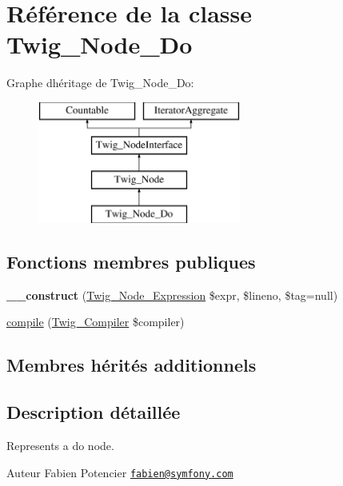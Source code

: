 \hypertarget{class_twig___node___do}{}\section{Référence de la classe Twig\+\_\+\+Node\+\_\+\+Do}
\label{class_twig___node___do}
Graphe d\textquotesingle{}héritage de Twig\+\_\+\+Node\+\_\+\+Do\+:\begin{figure}[H]
\begin{center}
\leavevmode
\includegraphics[height=4.000000cm]{class_twig___node___do}
\end{center}
\end{figure}
\subsection*{Fonctions membres publiques}
\begin{DoxyCompactItemize}
\item 
{\bfseries \+\_\+\+\_\+construct} (\hyperlink{class_twig___node___expression}{Twig\+\_\+\+Node\+\_\+\+Expression} \$expr, \$lineno, \$tag=null)\hypertarget{class_twig___node___do_a3846bdad0632470525ae7d3080f6b188}{}\label{class_twig___node___do_a3846bdad0632470525ae7d3080f6b188}

\item 
\hyperlink{class_twig___node___do_a4e0faa87c3fae583620b84d3607085da}{compile} (\hyperlink{class_twig___compiler}{Twig\+\_\+\+Compiler} \$compiler)
\end{DoxyCompactItemize}
\subsection*{Membres hérités additionnels}


\subsection{Description détaillée}
Represents a do node.

\begin{DoxyAuthor}{Auteur}
Fabien Potencier \href{mailto:fabien@symfony.com}{\tt fabien@symfony.\+com} 
\end{DoxyAuthor}



